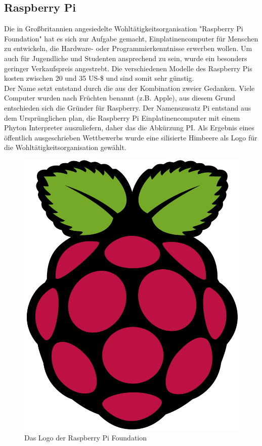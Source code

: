 \subsection{Raspberry Pi}\label{ss:Raspberry}

Die in Großbritannien angesiedelte Wohltätigkeitsorganisation "Raspberry Pi Foundation" hat es sich zur Aufgabe gemacht, Einplatinencomputer für Menschen zu entwickeln, die Hardware- oder Programmierkenntnisse erwerben wollen. Um auch für Jugendliche und Studenten ansprechend zu sein, wurde ein besonders geringer Verkaufspreis angestrebt. Die verschiedenen Modelle des Raspberry Pis kosten zwischen 20 und 35 US-\$ und sind somit sehr günstig.\\

Der Name setzt entstand durch die aus der Kombination zweier Gedanken. Viele Computer wurden nach Früchten benannt (z.B. Apple), aus diesem Grund entschieden sich die Gründer für Raspberry. Der Namenszusatz Pi entstand aus dem Ursprünglichen plan, die Raspberry Pi Einplatinencomputer mit einem Phyton Interpreter auszuliefern, daher das die Abkürzung PI. Als Ergebnis eines öffentlich ausgeschrieben Wettbewerbs wurde eine silisierte Himbeere als Logo für die Wohltätigkeitsorganisation gewählt.

\begin{figure}[H] 
	\centering
	\includegraphics[scale=0.15]{Bilder/raspberrylogo}
	\caption{Das Logo der Raspberry Pi Foundation\cite{i:raspberrylogo}}
	\label{f:raspberrylogo}
\end{figure}

